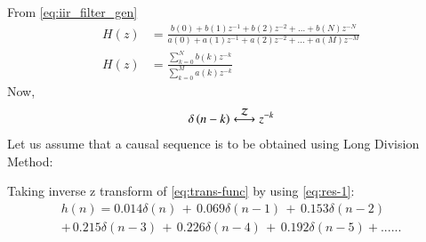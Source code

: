 \documentclass[journal,12pt,twocolumn]{IEEEtran}
\theoremstyle{remark}
\renewcommand\thesection{\arabic{section}}
\numberwithin{equation}{subsection}
\begin{document}
\begin{enumerate}[label=\thesection.\arabic*]
From \eqref{eq:iir_filter_gen} 
\begin{align}
    H(z) &= \frac{b(0) + b(1) z^{-1} + b(2) z^{-2} + \ldots + b(N) z^{-N}}{a(0) + a(1) z^{-1} + a(2) z^{-2} + \ldots + a(M) z^{-M}}\\
    H(z) &= \frac{\sum_{k = 0}^{N}b(k)z^{-k}}{\sum_{k = 0}^{M}a(k)z^{-k}} \label{eq:trans-func}
\end{align}
Now,
\begin{align}
    \delta\brak{n-k} \system{Z} z^{-k}\label{eq:res-1}
\end{align}
Let us assume that a causal sequence is to be obtained using Long Division Method:

Taking inverse z transform of \eqref{eq:trans-func} by using \eqref{eq:res-1}:
\begin{multline}
h(n) = 0.014\delta(n) \,+\, 0.069 \delta(n - 1)\, +\, 0.153\delta(n - 2) \\ + \,0.215\delta(n - 3) \,+ \, 0.226\delta(n - 4) \,+\, 0.192 \delta(n - 5) + ......
\end{multline}



\end{enumerate}
\end{document}
